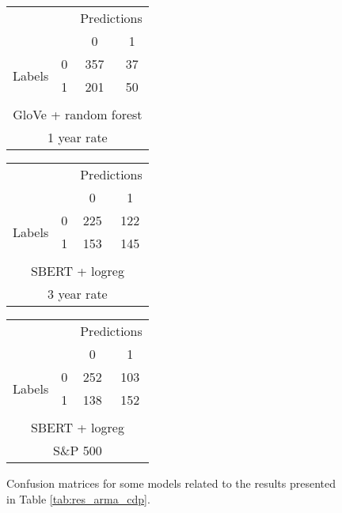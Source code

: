 \begin{figure}[!htb]
    \centering
    \begin{tabular}{cccc}
     & & \multicolumn{2}{c}{Predictions} \\
     & & \multicolumn{1}{|c|}{0} & \multicolumn{1}{c|}{1}\\
      \cline{2-4}
     \multirow{2}{*}{Labels} & 0 & \multicolumn{1}{|c|}{357} &  \multicolumn{1}{c|}{37} \\
      & 1 & \multicolumn{1}{|c|}{201} & \multicolumn{1}{c|}{50} \\ 
      \\ \multicolumn{4}{c}{GloVe + random forest} \\
      \multicolumn{4}{c}{1 year rate}
\end{tabular} \hspace{1em}
\begin{tabular}{cccc}
     & & \multicolumn{2}{c}{Predictions} \\
     & & \multicolumn{1}{|c|}{0} & \multicolumn{1}{c|}{1}\\
      \cline{2-4}
     \multirow{2}{*}{Labels} & 0 & \multicolumn{1}{|c|}{225} &  \multicolumn{1}{c|}{122} \\
      & 1 & \multicolumn{1}{|c|}{153} & \multicolumn{1}{c|}{145} \\ 
      \\ \multicolumn{4}{c}{SBERT + logreg} \\
      \multicolumn{4}{c}{3 year rate}
\end{tabular} \hspace{1em}
\begin{tabular}{cccc}
     & & \multicolumn{2}{c}{Predictions} \\
     & & \multicolumn{1}{|c|}{0} & \multicolumn{1}{c|}{1}\\
      \cline{2-4}
     \multirow{2}{*}{Labels} & 0 & \multicolumn{1}{|c|}{252} &  \multicolumn{1}{c|}{103} \\
      & 1 & \multicolumn{1}{|c|}{138} & \multicolumn{1}{c|}{152} \\ 
      \\ \multicolumn{4}{c}{SBERT + logreg} \\
      \multicolumn{4}{c}{S\&P 500}
\end{tabular}
    \caption{Confusion matrices for some models related to the results presented in Table \ref{tab:res_arma_cdp}.}
    \label{tab:confmat_arma_cdp}
\end{figure}

